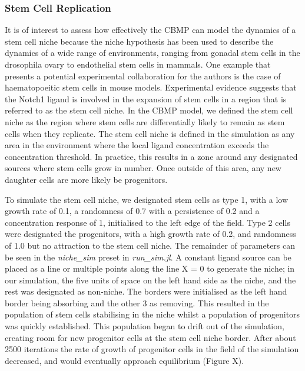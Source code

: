 \documentclass[12pt]{article}
\begin{document}
\subsubsection{Stem Cell Replication}
It is of interest to assess how effectively the CBMP can model the 
dynamics of a stem cell niche because the niche hypothesis has been used 
to describe the dynamics of a wide range of environments, ranging from 
gonadal stem cells in the drosophila ovary to endothelial stem cells in 
mammals.\cite{linheng05} One example that presents a potential experimental 
collaboration for the authors is the case of haematopoeitic stem cells in 
mouse models. Experimental evidence suggests that the Notch1 ligand is 
involved in the expansion of stem cells in a region that is referred to 
as the stem cell niche.\cite{calvi03} In the CBMP model, we defined the stem cell 
niche as the region where stem cells are differentially likely to remain 
as stem cells when they replicate. The stem cell niche is defined in the 
simulation as any area in the environment where the local ligand 
concentration exceeds the concentration threshold. In practice, this 
results in a zone around any designated sources where stem cells grow in 
number. Once outside of this area, any new daughter cells are more 
likely be progenitors. 

To simulate the stem cell niche, we designated stem cells as type 1, 
with a low growth rate of 0.1, a randomness of 0.7 with a persistence of 
0.2 and a concentration response of 1, initialised to the left edge of 
the field. Type 2 cells were designated the progenitors, with a high 
growth rate of 0.2, and randomness of 1.0 but no attraction to the stem 
cell niche. The remainder of parameters can be seen in the {\itshape 
niche\_sim} preset in {\itshape run\_sim.jl}. A constant ligand source can be 
placed as a line or multiple points along the line X = 0 to generate the 
niche; in our simulation, the five units of space on the left hand side 
as the niche, and the rest was designated as non-niche. The borders were 
initialised as the left hand border being absorbing and the other 3 as 
removing. This resulted in the population of stem cells stabilising in 
the niche whilst a population of progenitors was quickly established. 
This population began to drift out of the simulation, creating room for 
new progenitor cells at the stem cell niche border. After about 2500 
iterations the rate of growth of progenitor cells in the field of the 
simulation decreased, and would eventually approach equilibrium (Figure 
X).
\end{document}
